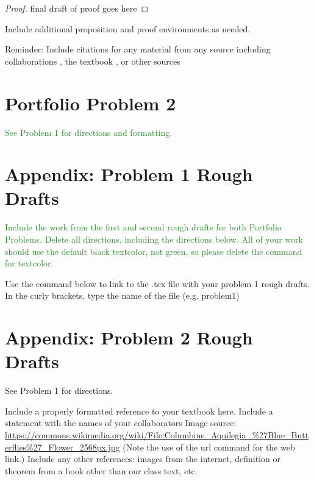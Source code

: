 \documentclass[12pt]{article}
\theoremstyle{definition}
\begin{document}
\begin{proof}
final draft of proof goes here
\end{proof}

\noindent Include additional proposition and proof environments as needed.

\noindent Reminder: Include citations for any material from any source including collaborations \cite{Collab1}, the textbook \cite{Sund21}, or other sources \cite{Whatever24}


\section{Portfolio Problem 2}

\textcolor{ForestGreen}{See Problem 1 for directions and formatting.}



\appendix


\section{Appendix: Problem 1 Rough Drafts}
\textcolor{ForestGreen}{Include the work from the first and second rough drafts for both Portfolio Problems. Delete all directions, including the directions below. All of your work should use the default black textcolor, not green, so please delete the command for textcolor.}

Use the command below to link to the .tex file with your problem 1 rough drafts. In the curly brackets, type the name of the file (e.g. problem1)





\section{Appendix: Problem 2 Rough Drafts}
See Problem 1 for directions.



\begin{thebibliography}{9}
  Include a properly formatted reference to your textbook here.
  Include a statement with the names of your collaborators
  Image source: \url{https://commons.wikimedia.org/wiki/File:Columbine_Aquilegia_%27Blue_Butterflies%27_Flower_2568px.jpg} (Note the use of the url command for the web link.)
   Include any other references: images from the internet, definition or theorem from a book other than our class text, etc.
\end{thebibliography}
\end{document}
